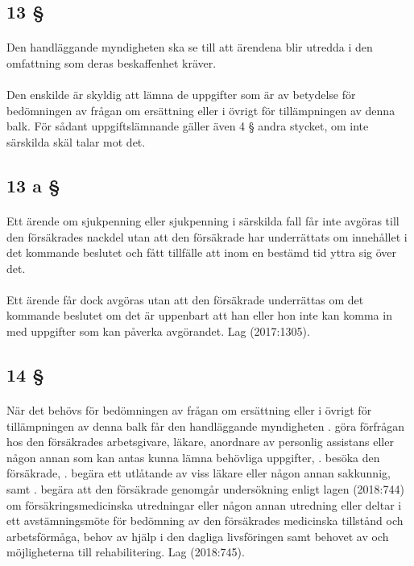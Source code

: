 \documentclass[a4paper,notitlepage,openany,10pt]{book}
\begin{document}
\subsection*{13 §}
\paragraph*{}
Den handläggande myndigheten ska se till att ärendena blir utredda i den omfattning som deras beskaffenhet kräver.
\paragraph*{}
Den enskilde är skyldig att lämna de uppgifter som är av betydelse för bedömningen av frågan om ersättning eller i övrigt för tillämpningen av denna balk. För sådant uppgiftslämnande gäller även 4 § andra stycket, om inte särskilda skäl talar mot det.
\subsection*{13 a §}
\paragraph*{}
Ett ärende om sjukpenning eller sjukpenning i särskilda fall får inte avgöras till den försäkrades nackdel utan att den försäkrade har underrättats om innehållet i det kommande beslutet och fått tillfälle att inom en bestämd tid yttra sig över det.
\paragraph*{}
Ett ärende får dock avgöras utan att den försäkrade underrättas om det kommande beslutet om det är uppenbart att han eller hon inte kan komma in med uppgifter som kan påverka avgörandet.
Lag (2017:1305).
\subsection*{14 §}
\paragraph*{}
När det behövs för bedömningen av frågan om ersättning eller i övrigt för tillämpningen av denna balk får den handläggande myndigheten
. göra förfrågan hos den försäkrades arbetsgivare, läkare, anordnare av personlig assistans eller någon annan som kan antas kunna lämna behövliga uppgifter,
. besöka den försäkrade,
. begära ett utlåtande av viss läkare eller någon annan sakkunnig, samt
. begära att den försäkrade genomgår undersökning enligt lagen (2018:744) om försäkringsmedicinska utredningar eller någon annan utredning eller deltar i ett avstämningsmöte för bedömning av den försäkrades medicinska tillstånd och arbetsförmåga, behov av hjälp i den dagliga livsföringen samt behovet av och möjligheterna till rehabilitering.
Lag (2018:745).
\end{document}
